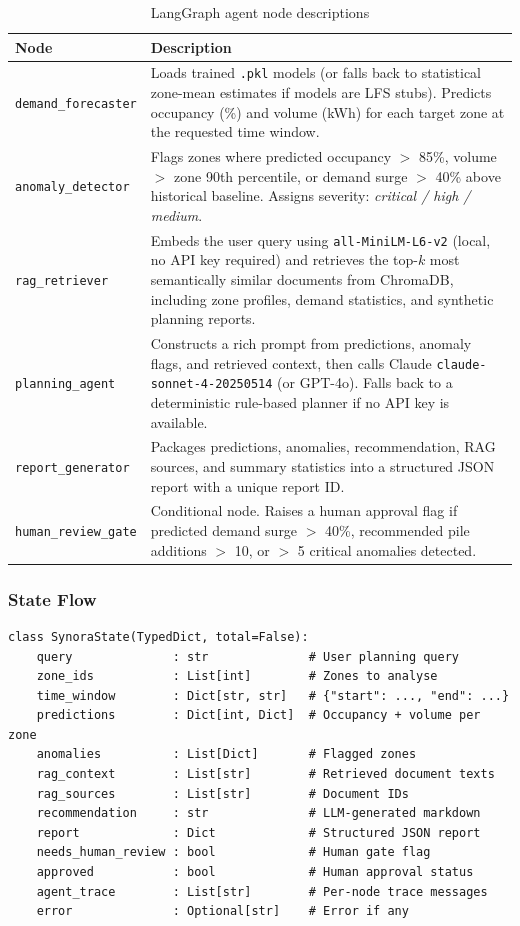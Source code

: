 \documentclass[12pt,a4paper]{article}
\begin{document}
\begin{table}[H]
\centering
\begin{tabular}{lp{10cm}}
\toprule
\textbf{Node} & \textbf{Description} \\
\midrule
\texttt{demand\_forecaster} &
  Loads trained \texttt{.pkl} models (or falls back to statistical zone-mean estimates
  if models are LFS stubs). Predicts occupancy (\%) and volume (kWh) for each
  target zone at the requested time window. \\[0.4em]
\texttt{anomaly\_detector} &
  Flags zones where predicted occupancy $>$ 85\%, volume $>$ zone 90th percentile,
  or demand surge $>$ 40\% above historical baseline.
  Assigns severity: \textit{critical / high / medium}. \\[0.4em]
\texttt{rag\_retriever} &
  Embeds the user query using \texttt{all-MiniLM-L6-v2} (local, no API key required)
  and retrieves the top-$k$ most semantically similar documents from ChromaDB,
  including zone profiles, demand statistics, and synthetic planning reports. \\[0.4em]
\texttt{planning\_agent} &
  Constructs a rich prompt from predictions, anomaly flags, and retrieved context,
  then calls Claude \texttt{claude-sonnet-4-20250514} (or GPT-4o). Falls back to
  a deterministic rule-based planner if no API key is available. \\[0.4em]
\texttt{report\_generator} &
  Packages predictions, anomalies, recommendation, RAG sources, and summary
  statistics into a structured JSON report with a unique report ID. \\[0.4em]
\texttt{human\_review\_gate} &
  Conditional node. Raises a human approval flag if predicted demand surge $>$ 40\%,
  recommended pile additions $>$ 10, or $>$ 5 critical anomalies detected. \\
\bottomrule
\end{tabular}
\caption{LangGraph agent node descriptions}
\end{table}

\subsubsection*{State Flow}

\begin{lstlisting}[caption={SynoraState TypedDict fields}]
class SynoraState(TypedDict, total=False):
    query              : str              # User planning query
    zone_ids           : List[int]        # Zones to analyse
    time_window        : Dict[str, str]   # {"start": ..., "end": ...}
    predictions        : Dict[int, Dict]  # Occupancy + volume per zone
    anomalies          : List[Dict]       # Flagged zones
    rag_context        : List[str]        # Retrieved document texts
    rag_sources        : List[str]        # Document IDs
    recommendation     : str              # LLM-generated markdown
    report             : Dict             # Structured JSON report
    needs_human_review : bool             # Human gate flag
    approved           : bool             # Human approval status
    agent_trace        : List[str]        # Per-node trace messages
    error              : Optional[str]    # Error if any
\end{lstlisting}
\end{document}
